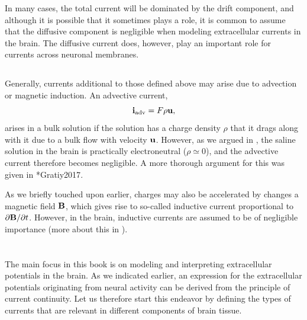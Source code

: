 In many cases, the total current will be dominated by the drift component, and although it is possible that it sometimes plays a role, it is common to assume that the diffusive component is negligible when modeling extracellular currents in the brain. The diffusive current does, however, play an important role for currents across neuronal membranes.


\subsection{}
\label{sec:Basics:OtherCurrents}
Generally, currents additional to those defined above may arise due to advection or magnetic induction. An advective current,
\begin{equation}
{\bf i}_\text{adv} = F \rho {\bf u},
\label{VC:eq:iadv}
\end{equation}
arises in a bulk solution if the solution has a charge density $\rho$ that it drags along with it due to a bulk flow with velocity ${\bf u}$. However, as we argued in , the saline solution in the brain is practically electroneutral ($\rho \simeq 0$), and the advective current therefore becomes  negligible. A more thorough argument for this was given in \citeasnoun**{Gratiy2017}.

As we briefly touched upon earlier, charges may also be accelerated by changes a magnetic field ${\bf B}$, which gives rise to so-called inductive current proportional to $\partial {\bf B}/\partial t$. However, in the brain, inductive currents are assumed to be of negligible importance  (more about this in ).




\section{}
\label{sec:Basics:ECSpot}
The main focus in this book is on modeling and interpreting extracellular potentials in the brain. As we indicated earlier, an expression for the extracellular potentials originating from neural activity can be derived from the principle of current continuity. 
Let us therefore start this endeavor by defining the types of currents that are relevant in different components of brain tissue.

